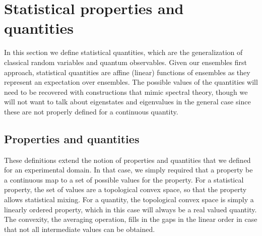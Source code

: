 \section{Statistical properties and quantities}

In this section we define statistical quantities, which are the generalization of classical random variables and quantum observables. Given our ensembles first approach, statistical quantities are affine (linear) functions of ensembles as they represent an expectation over ensembles. The possible values of the quantities will need to be recovered with constructions that mimic spectral theory, though we will not want to talk about eigenstates and eigenvalues in the general case since these are not properly defined for a continuous quantity.

\subsection{Properties and quantities}

These definitions extend the notion of properties and quantities that we defined for an experimental domain. In that case, we simply required that a property be a continuous map to a set of possible values for the property. For a statistical property, the set of values are a topological convex space, so that the property allows statistical mixing. For a quantity, the topological convex space is simply a linearly ordered property, which in this case will always be a real valued quantity. The convexity, the averaging operation, fills in the gaps in the linear order in case that not all intermediate values can be obtained.

